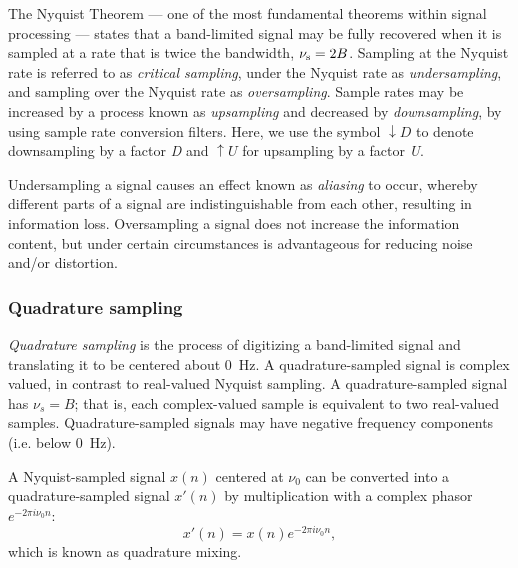 \documentclass{ws-rv961x669}
\begin{document}
The Nyquist Theorem --- one of the most fundamental theorems within signal processing --- states that a band-limited signal may be fully recovered when it is sampled at a rate that is twice the bandwidth, $\nu_{\rm{s}} = 2 B$. 
Sampling at the  Nyquist rate is referred to as \emph{critical sampling}, under the Nyquist rate as \emph{undersampling}, and sampling over the Nyquist rate as \emph{oversampling}. Sample rates may be increased by a process known as \emph{upsampling} and decreased by \emph{downsampling}, by using sample rate conversion filters. Here, we use the symbol $\downarrow D$ to denote downsampling by a factor \emph{D} and $\uparrow U$ for upsampling by a factor \emph{U}.

Undersampling a signal causes an effect known as \emph{aliasing} to occur, whereby different parts of a signal are indistinguishable from each other, resulting in information loss. Oversampling a signal does not increase the information content, but under certain circumstances is advantageous for reducing noise and/or distortion.


\subsubsection{Quadrature sampling}

\emph{Quadrature sampling}\cite{Lyons:2000uy} is the process of digitizing a band-limited signal and translating it to be centered about 0~Hz. A quadrature-sampled signal is complex valued, in contrast to real-valued Nyquist sampling. A quadrature-sampled signal has $\nu_{s} = B$; that is, each complex-valued sample is equivalent to two real-valued samples. Quadrature-sampled signals may have negative frequency components (i.e. below 0~Hz).

A Nyquist-sampled signal $x(n)$ centered at $\nu_0$ can be converted into a quadrature-sampled signal $x'(n)$ by multiplication with a complex phasor $e^{-2\pi i \nu_0 n}$:
\begin{equation}
	x'(n) = x(n) e^{-2 \pi i \nu_0 n},\label{eq:mix}
\end{equation}
which is known as quadrature mixing.
\end{document}
